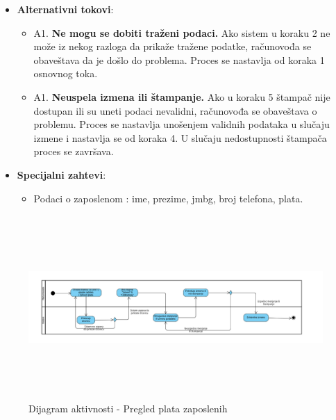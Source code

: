 \begin{itemize}
  \item \textbf{Alternativni tokovi}:
      \begin{itemize}
        \item A1. \textbf{Ne mogu se dobiti traženi podaci.}
        Ako sistem u koraku 2 ne može iz nekog razloga da prikaže tražene podatke, računovođa se obaveštava da je došlo do problema.
        Proces se nastavlja od koraka 1 osnovnog toka.
        \item A1. \textbf{Neuspela izmena ili štampanje.}
        Ako u koraku 5 štampač nije dostupan ili su uneti podaci nevalidni, računovođa se obaveštava o problemu. Proces se nastavlja unošenjem
        validnih podataka u slučaju izmene i nastavlja se od koraka 4. U slučaju nedostupnosti štampača proces se završava.
      \end{itemize}

      
  \item \textbf{Specijalni zahtevi}:
      \begin{itemize}
        \item Podaci o zaposlenom : ime, prezime, jmbg, broj telefona, plata.
      \end{itemize}
\end{itemize}

\begin{figure}[H]
  \begin{center}
      \includegraphics[width=170mm, height=70mm]{Diagrams/pregled_zaposlenih.png}
  \end{center}
  \caption {Dijagram aktivnosti - Pregled plata zaposlenih}
  \label{activity_pregled_zaposlenih}

\end{figure}
